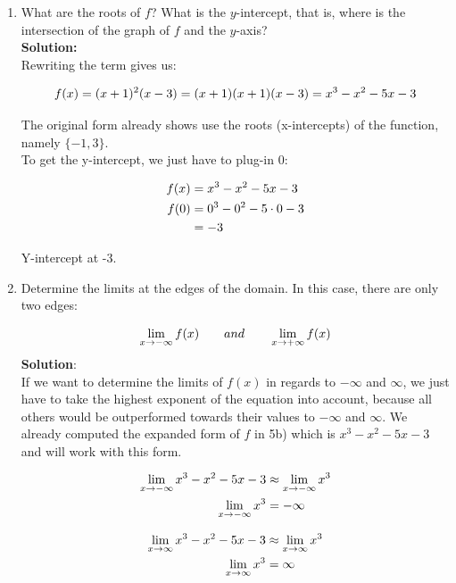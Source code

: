 \documentclass[a4paper]{article}
\begin{document}
\begin{enumerate}
\begin{enumerate}
	\item What are the roots of $f$? What is the $y$-intercept, that is, where is the intersection of the graph of $f$ and the $y$-axis?\\
	\textbf{Solution:}\\
	
Rewriting the term gives us:	
	
\begin{align}
	f(x) = (x+1)^2(x-3) = (x+1)(x+1)(x-3) = x^3 - x^2 - 5x - 3\notag
\end{align}	
	
The original form already shows use the roots (x-intercepts) of the function, namely $\{-1,3 \}$.\\
	
To get the y-intercept, we just have to plug-in 0:

\begin{align}
	f(x) &= x^3 - x^2 - 5x - 3\notag\\
	f(0) &= 0^3 - 0^2 - 5 \cdot 0 - 3\notag\\
		&= -3\notag
\end{align}	
	
Y-intercept at -3.\\
	
	
	\item Determine the limits at the edges of the domain. In this case, there are only two edges:
	
	\begin{align}
	\lim_{x \to -\infty }f(x) \qquad and \qquad \lim_{x \to +\infty}f(x)\notag	
	\end{align}	
	\textbf{Solution}:\\
	
If we want to determine the limits of $f(x)$ in regards to $- \infty$ and $\infty$, we just have to take the highest exponent of the equation into account, because all others would be outperformed towards their values to $- \infty$ and $\infty$. We already computed the expanded form of $f$ in 5b) which is $x^3 - x^2 - 5x - 3$ and will work with this form. 	
	
\begin{align}
	\lim_{x \to -\infty} x^3 - x^2 - 5x - 3 &\approx \lim_{x \to -\infty} x^3\notag\\
	\lim_{x \to -\infty} x^3 &= -\infty\notag
\end{align}	

\begin{align}
	\lim_{x \to \infty} x^3 - x^2 - 5x - 3 &\approx \lim_{x \to \infty} x^3\notag\\
	\lim_{x \to \infty} x^3 &= \infty\notag
\end{align}			
	

\end{enumerate}
\end{enumerate}
\end{document}
